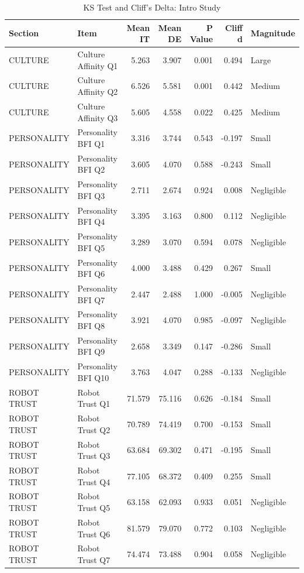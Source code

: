 \begin{table}
\caption{KS Test and Cliff's Delta: Intro Study}
\label{tab:intro_stats}
\begin{tabular}{llrrrrl}
\toprule
Section & Item & Mean IT & Mean DE & P Value & Cliff d & Magnitude \\
\midrule
CULTURE & Culture Affinity Q1 & 5.263 & 3.907 & 0.001 & 0.494 & Large \\
CULTURE & Culture Affinity Q2 & 6.526 & 5.581 & 0.001 & 0.442 & Medium \\
CULTURE & Culture Affinity Q3 & 5.605 & 4.558 & 0.022 & 0.425 & Medium \\
PERSONALITY & Personality BFI Q1 & 3.316 & 3.744 & 0.543 & -0.197 & Small \\
PERSONALITY & Personality BFI Q2 & 3.605 & 4.070 & 0.588 & -0.243 & Small \\
PERSONALITY & Personality BFI Q3 & 2.711 & 2.674 & 0.924 & 0.008 & Negligible \\
PERSONALITY & Personality BFI Q4 & 3.395 & 3.163 & 0.800 & 0.112 & Negligible \\
PERSONALITY & Personality BFI Q5 & 3.289 & 3.070 & 0.594 & 0.078 & Negligible \\
PERSONALITY & Personality BFI Q6 & 4.000 & 3.488 & 0.429 & 0.267 & Small \\
PERSONALITY & Personality BFI Q7 & 2.447 & 2.488 & 1.000 & -0.005 & Negligible \\
PERSONALITY & Personality BFI Q8 & 3.921 & 4.070 & 0.985 & -0.097 & Negligible \\
PERSONALITY & Personality BFI Q9 & 2.658 & 3.349 & 0.147 & -0.286 & Small \\
PERSONALITY & Personality BFI Q10 & 3.763 & 4.047 & 0.288 & -0.133 & Negligible \\
ROBOT TRUST & Robot Trust Q1 & 71.579 & 75.116 & 0.626 & -0.184 & Small \\
ROBOT TRUST & Robot Trust Q2 & 70.789 & 74.419 & 0.700 & -0.153 & Small \\
ROBOT TRUST & Robot Trust Q3 & 63.684 & 69.302 & 0.471 & -0.195 & Small \\
ROBOT TRUST & Robot Trust Q4 & 77.105 & 68.372 & 0.409 & 0.255 & Small \\
ROBOT TRUST & Robot Trust Q5 & 63.158 & 62.093 & 0.933 & 0.051 & Negligible \\
ROBOT TRUST & Robot Trust Q6 & 81.579 & 79.070 & 0.772 & 0.103 & Negligible \\
ROBOT TRUST & Robot Trust Q7 & 74.474 & 73.488 & 0.904 & 0.058 & Negligible \\

\end{tabular}
\end{table}
